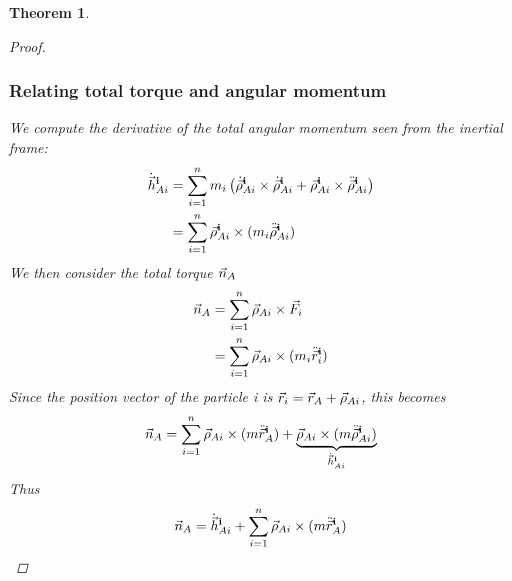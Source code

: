 \documentclass{article}
\newtheorem{theorem}{Theorem}
\begin{document}
\begin{theorem}
\begin{proof}
        \subsubsection*{Relating total torque and angular momentum}
        We compute the derivative of the total angular momentum seen from the inertial frame:
        \begin{align*}
            \dot{\vec{h}}_{Ai}^{\mathbf{i}} &= \sum_{i=1}^nm_i\left(\dot{\vec{\rho}}_{Ai}^{\mathbf{i}}\times\dot{\vec{\rho}}_{Ai}^{\mathbf{i}} +{\vec{\rho}}_{Ai}^{\mathbf{i}}\times \ddot{\vec{\rho}}_{Ai}^{\mathbf{i}}\right)
            \\ &= \sum_{i=1}^n\vec{\rho}_{Ai}^{\mathbf{i}} \times (m_i\ddot{\vec{\rho}}_{Ai}^{\mathbf{i}})
        \end{align*}
        We then consider the total torque $\vec{n}_A$
        \begin{align*}
            \vec{n}_A &= \sum_{i=1}^n\vec{\rho}_{Ai}\times\vec{F}_i\\
            &=\sum_{i=1}^n\vec{\rho}_{Ai}\times(m_i\ddot{\vec{r}}_i^{\mathbf{i}}) \\
        \end{align*}
        Since the position vector of the particle i is $\vec{r}_i = \vec{r}_A + \vec{\rho}_{Ai}$, this becomes
        \begin{align*}
            \vec{n}_A = \sum_{i=1}^n \vec{\rho}_{Ai} \times (m\ddot{\vec{r}}_A^{\mathbf{i}})
            + \underbrace{\vec{\rho}_{Ai} \times (m\ddot{\vec{\rho}}_{Ai}^{\mathbf{i}})}_{\dot{\vec{h}}_{Ai}^{\mathbf{i}}}
        \end{align*}
        Thus
        \begin{align*}
            \vec{n}_A = \dot{\vec{h}}_{Ai}^{\mathbf{i}} + \sum_{i=1}^n \vec{\rho}_{Ai} \times (m\ddot{\vec{r}}_A^{\mathbf{i}})
        \end{align*}
    \end{proof}
\end{theorem}
\end{document}
